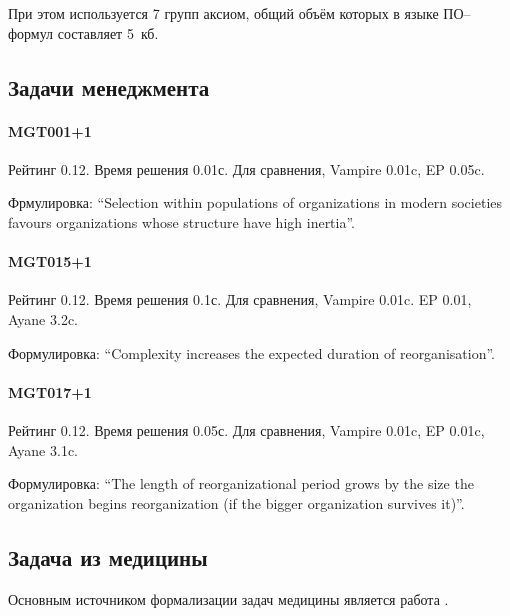 При этом используется 7 групп аксиом, общий объём которых в языке ПО--формул составляет 5~кб.

\subsection{Задачи менеджмента}

\paragraph{MGT001+1}
Рейтинг 0.12. Время решения 0.01с. Для сравнения, Vampire 0.01c, EP 0.05c.

Фрмулировка: ``Selection within populations of organizations in modern societies favours organizations whose structure have high inertia''.

\paragraph{MGT015+1}
Рейтинг 0.12. Время решения 0.1с. Для сравнения, Vampire 0.01c. EP 0.01, Ayane 3.2c.

Формулировка: ``Complexity increases the expected duration of reorganisation''.

\paragraph{MGT017+1}
Рейтинг 0.12. Время решения 0.05с. Для сравнения, Vampire 0.01c, EP 0.01c, Ayane 3.1c.

 Формулировка: ``The length of reorganizational period grows by the size the organization begins reorganization (if the bigger organization survives it)''.



\subsection{Задача из медицины}
Основным источником формализации задач медицины является работа \cite{med1}.


